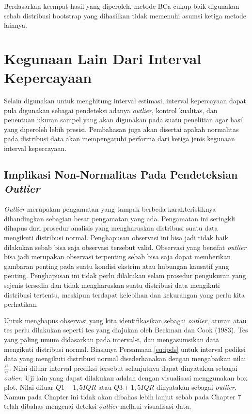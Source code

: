 \documentclass[]{book}
\begin{document}
Berdasarkan keempat hasil yang diperoleh, metode BCa cukup baik
digunakan sebab distribusi bootstrap yang dihasilkan tidak memenuhi
asumsi ketiga metode lainnya.

\section{Kegunaan Lain Dari Interval
Kepercayaan}\label{kegunaan-lain-dari-interval-kepercayaan}

Selain digunakan untuk menghitung interval estimasi, interval
kepercayaan dapat pula digunakan sebagai pendeteksi adanya
\emph{outlier}, kontrol kualitas, dan penentuan ukuran sampel yang akan
digunakan pada suatu penelitian agar hasil yang diperoleh lebih presisi.
Pembahasan juga akan disertai apakah normalitas pada distribusi data
akan mempengaruhi performa dari ketiga jenis kegunaan interval
kepercayaan.

\subsection{\texorpdfstring{Implikasi Non-Normalitas Pada Pendeteksian
\emph{Outlier}}{Implikasi Non-Normalitas Pada Pendeteksian Outlier}}\label{implikasi-non-normalitas-pada-pendeteksian-outlier}

\emph{Outlier} merupakan pengamatan yang tampak berbeda karakteristiknya
dibandingkan sebagian besar pengamatan yang ada. Pengamatan ini
seringkli dihapus dari prosedur analisis yang mengharuskan distribusi
suatu data mengikuti distribusi normal. Penghapusan observasi ini bisa
jadi tidak baik dilakukan sebab bisa saja observasi tersebut valid.
Observasi yang bersifat \emph{outlier} bisa jadi merupakan observasi
terpenting sebab bisa saja dapat memberikan gambaran penting pada suatu
kondisi ekstrim atau hubungan kausatif yang penting. Penghapusan ini
tidak perlu dilakukan selam prosedur pengukuran yang sejenis tersedia
dan tidak mengharuskan suatu distribusi data mengikuti distribusi
tertentu, meskipun terdapat kelebihan dan kekurangan yang perlu kita
perhatikan.

Untuk menghapus observasi yang kita identifikasikan sebagai
\emph{outlier}, aturan atau tes perlu dilakukan seperti tes yang
diajukan oleh Beckman dan Cook (1983). Tes yang paling umum didasarkan
pada interval-t, dan mengasumsikan data mengikuti distribusi normal.
Biasanya Persamaan \eqref{eq:ipds} untuk interval pediksi data yang
mengikuti distribusi normal disederhanakan dengan mengabaikan nilai
\(\frac{s^2}{n}\). Nilai diluar interval prediksi tersebut selanjutnya
dapat dinyatakan sebagai \emph{oulier}. Uji lain yang dapat dilakukan
adalah dengan visualisasi menggunakan box plot. Nilai diluar
\(Q1-1,5IQR\) atau \(Q3+1,5IQR\) dinyatakan sebagai \emph{outlier}.
Namun pada Chapter ini tidak akan dibahas lebih lanjut sebab pada
Chapter 7 telah dibahas mengenai deteksi \emph{outlier} mellaui
visualisasi data.
\end{document}
